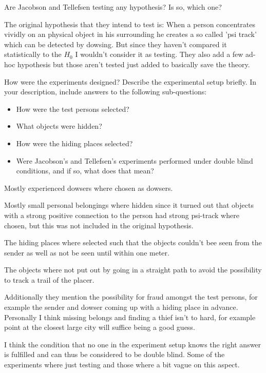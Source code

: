\documentclass[a4paper,twoside=false,abstract=false,numbers=noenddot,
titlepage=false,headings=small,parskip=half,version=last]{scrartcl}
\begin{document}

\begin{exercise}{1} 
    Are Jacobson and Tellefsen testing any hypothesis? Is so, which one?
\end{exercise}
\begin{solution}
    The original hypothesis that they intend to test is: 
    When a person concentrates vividly on an
    physical object in his surrounding he creates a so called 'psi track' which
    can be detected by dowsing. 
    But since they haven't compared it
    statistically to the $H_0$ I wouldn't consider it as testing. They also add
    a few ad-hoc hypothesis but those aren't tested just added to basically
    save the theory.
\end{solution}

\begin{exercise}{2} 
    How were the experiments designed? Describe the experimental setup briefly.
    In your description, include answers to the following sub-questions:
    \begin{itemize}
        \item How were the test persons selected?
        \item What objects were hidden?
        \item How were the hiding places selected?
        \item Were Jacobson's and Tellefsen's experiments performed under
        double blind conditions, and if so, what does that mean?
    \end{itemize}
\end{exercise}
\begin{solution}

    Mostly experienced dowsers where chosen as dowsers.

    Mostly small  personal belongings where hidden since it turned out 
    that objects with a
    strong positive connection to the person had strong psi-track where
    chosen, but this was not included in the original hypothesis. 
    
    The hiding places where selected such that the objects couldn't bee seen
    from the sender as well as not be seen until within one meter.

    The objects where not put out by going in a straight path to avoid the
    possibility to track a trail of the placer. 

    Additionally they mention the possibility for fraud amongst the test
    persons, for example the sender and dowser coming up with a hiding place in
    advance. Personally I think missing belongs and finding a thief isn't to
    hard, for example point at the closest large city will suffice being a good
    guess.

    I think the condition that no one in the experiment setup knows the right
    answer is fulfilled and can thus be considered to be double blind. Some of
    the experiments where just testing and those where a bit vague on
    this aspect.

\end{solution}
\end{document}
